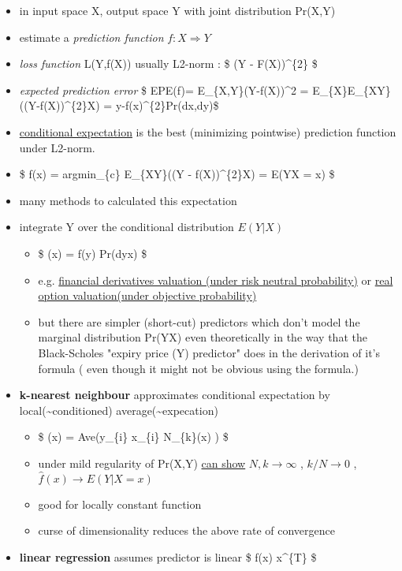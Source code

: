 \documentclass[11pt]{article}
\providecommand{\tightlist}{%
      \setlength{\itemsep}{0pt}\setlength{\parskip}{0pt}}
\begin{document}
\begin{itemize}
\tightlist
\item
  in input space X, output space Y with joint distribution Pr(X,Y)
\item
  estimate a \emph{prediction function} \(f:X \Rightarrow Y\)
\item
  \emph{loss function} L(Y,f(X)) usually L2-norm : \$ (Y -
  F(X))\^{}\{2\} \$\\
\item
  \emph{expected prediction error} \$ EPE(f)= E\_\{X,Y\}(Y-f(X))\^{}2 =
  E\_\{X\}E\_\{X\textbar{}Y\}((Y-f(X))\^{}\{2\}\textbar{}X) =
  \int\textbar{}y-f(x)\textbar{}\^{}\{2\}Pr(dx,dy)\$
\item
  \href{http://math.tntech.edu/machida/4470/booklet/booklet/node21.html}{conditional
  expectation} is the best (minimizing pointwise) prediction function
  under L2-norm.
\item
  \$ f(x) = argmin\_\{c\} E\_\{X\textbar{}Y\}((Y -
  f(X))\^{}\{2\}\textbar{}X) = E(Y\textbar{}X = x) \$
\item
  many methods to calculated this expectation
\item
  integrate Y over the conditional distribution \(E(Y|X)\)

  \begin{itemize}
  \tightlist
  \item
    \$ (x) = \int f(y) Pr(dy\textbar{}x) \$
  \item
    e.g.
    \href{https://en.wikipedia.org/wiki/Valuation_of_options\#Pricing_models}{financial
    derivatives valuation (under risk neutral probability)} or
    \href{https://en.wikipedia.org/wiki/Real_options_valuation}{real
    option valuation(under objective probability)}
  \item
    but there are simpler (short-cut) predictors which don't model the
    marginal distribution Pr(Y\textbar{}X) even theoretically in the way
    that the Black-Scholes "expiry price (Y) predictor" does in the
    derivation of it's formula ( even though it might not be obvious
    using the formula.)\\
  \end{itemize}
\item
  \textbf{k-nearest neighbour} approximates conditional expectation by
  local(\textasciitilde{}conditioned)
  average(\textasciitilde{}expecation)

  \begin{itemize}
  \tightlist
  \item
    \$ (x) = Ave(y\_\{i\}\textbar{} x\_\{i\} \in N\_\{k\}(x) ) \$
  \item
    under mild regularity of Pr(X,Y)
    \href{http://cseweb.ucsd.edu/~dasgupta/papers/nn-rates.pdf}{can
    show} \(N,k\to\infty\) , \(k/N\to0\) , \(\hat{f}(x) \to E(Y|X=x)\)
  \item
    good for locally constant function
  \item
    curse of dimensionality reduces the above rate of convergence
  \end{itemize}
\item
  \textbf{linear regression} assumes predictor is linear \$ f(x)
  \approx x\^{}\{T\} \beta \$


\end{itemize}
\end{document}
